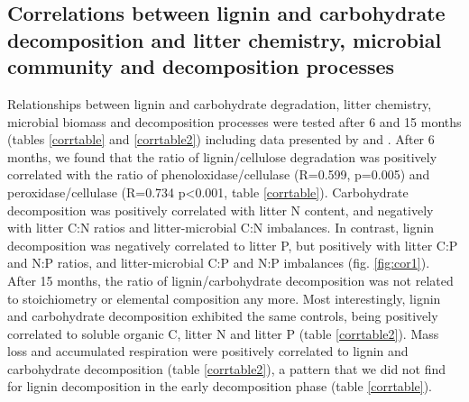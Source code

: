 \subsection*{Correlations between lignin and carbohydrate decomposition and litter chemistry, microbial community and decomposition processes}

Relationships between lignin and carbohydrate degradation, litter chemistry, microbial biomass and decomposition processes were tested after 6 and 15 months (tables \ref{corrtable} and \ref{corrtable2}) including data presented by \cite{Mooshammer2011} and \cite{Leitner2011}. After 6 months, we found that the ratio of lignin/cellulose degradation was positively correlated with the ratio of phenoloxidase/cellulase (R=0.599, p=0.005) and peroxidase/cellulase (R=0.734 p\textless 0.001, table \ref{corrtable}). Carbohydrate decomposition was positively correlated with litter N content, and negatively with litter C:N ratios and litter-microbial C:N imbalances. In contrast, lignin decomposition was negatively correlated to litter P, but positively with litter C:P and N:P ratios, and litter-microbial C:P and N:P imbalances (fig. \ref{fig:cor1}). After 15 months, the ratio of lignin/carbohydrate decomposition was not related to stoichiometry or elemental composition any more. Most interestingly, lignin and carbohydrate decomposition exhibited the same controls, being positively correlated to soluble organic C, litter N and litter P (table \ref{corrtable2}). Mass loss and accumulated respiration were positively correlated to lignin and carbohydrate decomposition (table \ref{corrtable2}), a pattern that we did not find for lignin decomposition in the early decomposition phase (table \ref{corrtable}).
